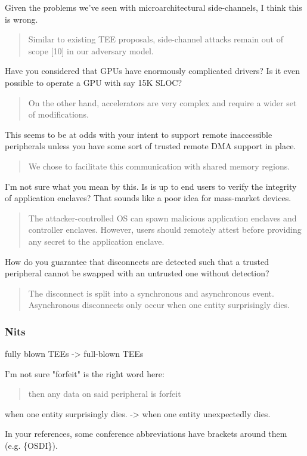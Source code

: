 \documentclass[9pt]{article}
\begin{document}
Given the problems we've seen with microarchitectural side-channels, I
think this is wrong.

\begin{quote}
Similar to existing TEE proposals, side-channel attacks remain out of
scope {[}10{]} in our adversary model.
\end{quote}

Have you considered that GPUs have enormously complicated drivers? Is
it even possible to operate a GPU with say 15K SLOC?


\begin{quote}
On the other hand, accelerators are very complex and require a wider set
of modiﬁcations.
\end{quote}

This seems to be at odds with your intent to support remote inaccessible
peripherals unless you have some sort of trusted remote DMA support in
place.

\begin{quote}
We chose to facilitate this communication with shared memory regions.
\end{quote}

I'm not sure what you mean by this. Is is up to end users to verify the
integrity of application enclaves? That sounds like a poor idea for
mass-market devices.

\begin{quote}
The attacker-controlled OS can spawn malicious application enclaves and
controller enclaves. However, users should remotely attest before
providing any secret to the application enclave.
\end{quote}

How do you guarantee that disconnects are detected such that a trusted
peripheral cannot be swapped with an untrusted one without detection?

\begin{quote}
The disconnect is split into a synchronous and asynchronous event.
Asynchronous disconnects only occur when one entity surprisingly dies.
\end{quote}

\subsubsection{Nits}

fully blown TEEs -\textgreater{} full-blown TEEs

I'm not sure "forfeit" is the right word here:

\begin{quote}
then any data on said peripheral is forfeit
\end{quote}

when one entity surprisingly dies. -\textgreater{} when one entity
unexpectedly dies.

In your references, some conference abbreviations have brackets around
them (e.g. \{OSDI\}).
\end{document}
